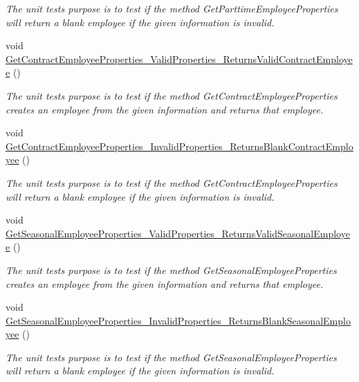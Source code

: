 \begin{DoxyCompactItemize}
\begin{DoxyCompactList}\small\item\em The unit test\textquotesingle{}s purpose is to test if the method Get\+Parttime\+Employee\+Properties will return a blank employee if the given information is invalid. \end{DoxyCompactList}\item 
void \hyperlink{class_the_company_1_1_tests_1_1_add_employee_tests_a736db3f025050c4ac8e09a238b1281b0}{Get\+Contract\+Employee\+Properties\+\_\+\+Valid\+Properties\+\_\+\+Returns\+Valid\+Contract\+Employee} ()
\begin{DoxyCompactList}\small\item\em The unit test\textquotesingle{}s purpose is to test if the method Get\+Contract\+Employee\+Properties creates an employee from the given information and returns that employee. \end{DoxyCompactList}\item 
void \hyperlink{class_the_company_1_1_tests_1_1_add_employee_tests_a01ea79c78f37608dcc2a2581d281f48a}{Get\+Contract\+Employee\+Properties\+\_\+\+Invalid\+Properties\+\_\+\+Returns\+Blank\+Contract\+Employee} ()
\begin{DoxyCompactList}\small\item\em The unit test\textquotesingle{}s purpose is to test if the method Get\+Contract\+Employee\+Properties will return a blank employee if the given information is invalid. \end{DoxyCompactList}\item 
void \hyperlink{class_the_company_1_1_tests_1_1_add_employee_tests_ac30034a498a77c2fc126bd6bdfd7c6b7}{Get\+Seasonal\+Employee\+Properties\+\_\+\+Valid\+Properties\+\_\+\+Returns\+Valid\+Seasonal\+Employee} ()
\begin{DoxyCompactList}\small\item\em The unit test\textquotesingle{}s purpose is to test if the method Get\+Seasonal\+Employee\+Properties creates an employee from the given information and returns that employee. \end{DoxyCompactList}\item 
void \hyperlink{class_the_company_1_1_tests_1_1_add_employee_tests_a3a016a2644147e1986067c9904f3eccd}{Get\+Seasonal\+Employee\+Properties\+\_\+\+Invalid\+Properties\+\_\+\+Returns\+Blank\+Seasonal\+Employee} ()
\begin{DoxyCompactList}\small\item\em The unit test\textquotesingle{}s purpose is to test if the method Get\+Seasonal\+Employee\+Properties will return a blank employee if the given information is invalid. \end{DoxyCompactList}\item 

\end{DoxyCompactItemize}
